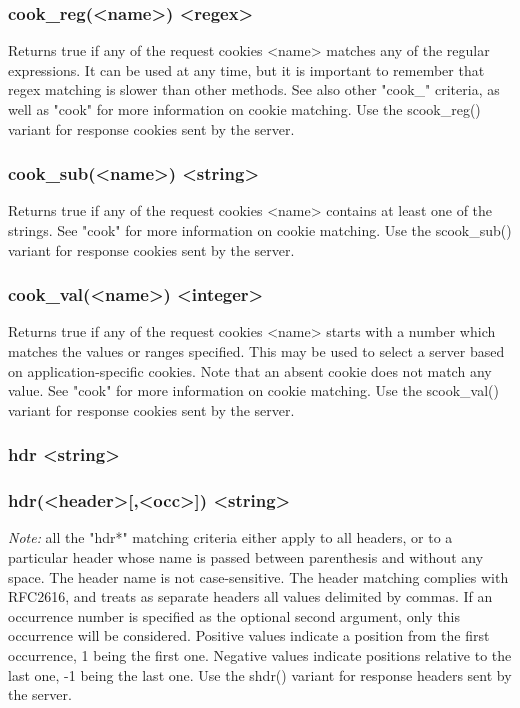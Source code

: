 \subsubsection[cook\_reg]{cook\_reg(<name>) <regex>}
  Returns true if any of the request cookies <name> matches any of the regular
  expressions. It can be used at any time, but it is important to remember that
  regex matching is slower than other methods. See also other "cook\_" criteria,
  as well as "cook" for more information on cookie matching. Use the
  scook\_reg() variant for response cookies sent by the server.

\subsubsection[cook\_sub]{cook\_sub(<name>) <string>}
  Returns true if any of the request cookies <name> contains at least one of
  the strings. See "cook" for more information on cookie matching. Use the
  scook\_sub() variant for response cookies sent by the server.

\subsubsection[cook\_val]{cook\_val(<name>) <integer>}
  Returns true if any of the request cookies <name> starts with a number which
  matches the values or ranges specified. This may be used to select a server
  based on application-specific cookies. Note that an absent cookie does not
  match any value. See "cook" for more information on cookie matching. Use the
  scook\_val() variant for response cookies sent by the server.

\subsubsection[hdr]{hdr <string>}
\subsubsection*{hdr(<header>[,<occ>]) <string>}
  \emph{Note:} all the "hdr*" matching criteria either apply to all headers, or to a
  particular header whose name is passed between parenthesis and without any
  space. The header name is not case-sensitive. The header matching complies
  with RFC2616, and treats as separate headers all values delimited by commas.
  If an occurrence number is specified as the optional second argument, only
  this occurrence will be considered. Positive values indicate a position from
  the first occurrence, 1 being the first one. Negative values indicate
  positions relative to the last one, -1 being the last one. Use the shdr()
  variant for response headers sent by the server.

